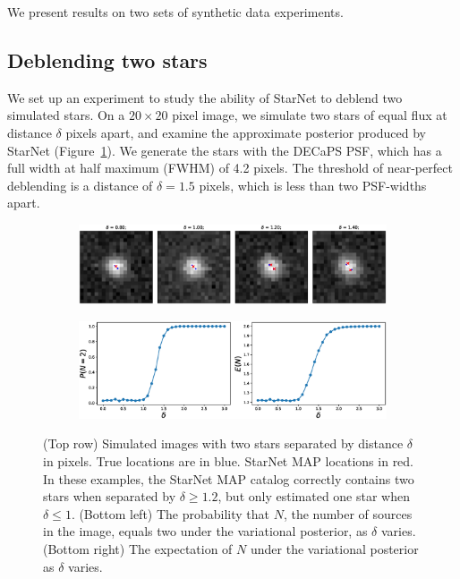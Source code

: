 
We present results on two sets of synthetic data experiments.

\subsection{Deblending two stars}

We set up an experiment to study the
ability of StarNet to deblend two simulated stars.
On a $20\times20$ pixel image,
we simulate two stars of equal flux at distance $\delta$ pixels apart, and
examine the approximate posterior produced by StarNet (Figure~\ref{fig:deblending_fig}).
We generate the stars with the DECaPS PSF, which 
has a full width at half maximum (FWHM) of 4.2 pixels. 
The threshold of near-perfect deblending is a distance of $\delta = 1.5$ pixels, which is less than two PSF-widths apart. 

\begin{figure}[tb]
    \centering
    \begin{subfigure}{0.8\textwidth}
        \includegraphics[width=\textwidth]{figures_vg/deblending/example_deblending.eps}
    \end{subfigure}
    \begin{subfigure}{0.8\textwidth}
        \includegraphics[width=\textwidth]{figures_vg/deblending/summary_statistics.eps}
    \end{subfigure}
    \caption{(Top row) Simulated images with two stars separated by distance $\delta$ in pixels.
    True locations are in blue. StarNet MAP locations in red. 
    In these examples, the StarNet MAP catalog correctly contains two stars when separated by $\delta \geq 1.2$,
    but only estimated one star when $\delta \leq 1$.
    (Bottom left) The probability that $N$, the number of sources in the image, equals two
    under the variational posterior, as $\delta$ varies.
    (Bottom right) The expectation of $N$ under the variational posterior as $\delta$ varies. }
    \label{fig:deblending_fig}
\end{figure}

